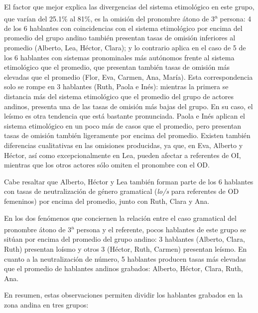 \documentclass[output=paper]{../langscibook}
\begin{document}
El factor que mejor explica las divergencias del sistema etimológico en este grupo, que varían del 25.1\% al 81\%, es la omisión del pronombre átono de 3\textsuperscript{a} persona: 4 de los 6 hablantes con coincidencias con el sistema etimológico por encima del promedio del grupo andino también presentan tasas de omisión inferiores al promedio (Alberto, Lea, Héctor, Clara); y lo contrario aplica en el caso de 5 de los 6 hablantes con sistemas pronominales más autónomos frente al sistema etimológico que el promedio, que presentan también tasas de omisión más elevadas que el promedio (Flor, Eva, Carmen, Ana, María). Esta correspondencia solo se rompe en 3 hablantes (Ruth, Paola e Inés): mientras la primera se distancia más del sistema etimológico que el promedio del grupo de actores andinos, presenta una de las tasas de omisión más bajas del grupo. En su caso, el leísmo es otra tendencia que está bastante pronunciada. Paola e Inés aplican el sistema etimológico en un poco más de casos que el promedio, pero presentan tasas de omisión también ligeramente por encima del promedio. Existen también diferencias cualitativas en las omisiones producidas, ya que, en Eva, Alberto y Héctor, así como excepcionalmente en Lea, pueden afectar a referentes de OI, mientras que los otros actores sólo omiten el pronombre con el OD. 

Cabe resaltar que Alberto, Héctor y Lea también forman parte de los 6 hablantes con tasas de neutralización de género gramatical (\textit{lo/s} para referentes de OD femeninos) por encima del promedio, junto con Ruth, Clara y Ana. 


En los dos fenómenos que conciernen la relación entre el caso gramatical del pronombre átono de 3\textsuperscript{a} persona y el referente, pocos hablantes de este grupo se sitúan por encima del promedio del grupo andino: 3 hablantes (Alberto, Clara, Ruth) presentan loísmo y otros 3 (Héctor, Ruth, Carmen) presentan leísmo. En cuanto a la neutralización de número, 5 hablantes producen tasas más elevadas que el promedio de hablantes andinos grabados: Alberto, Héctor, Clara, Ruth, Ana. 

En resumen, estas observaciones permiten dividir los hablantes grabados en la zona andina en tres grupos:
\end{document}
